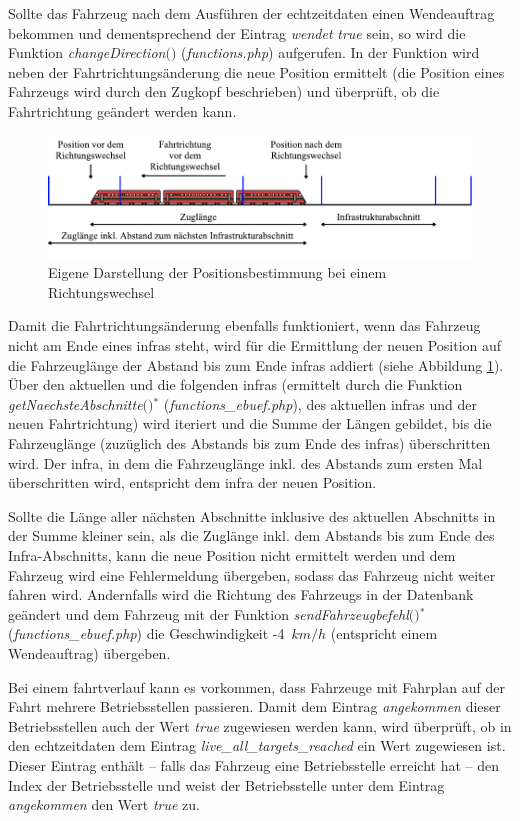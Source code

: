 Sollte das Fahrzeug nach dem Ausführen der \Gls{echtzeitdaten} einen Wendeauftrag bekommen und dementsprechend der Eintrag \textit{wendet} \textit{true} sein, so wird die Funktion \textit{change\-Direction$($$)$} (\textit{functions.php}) aufgerufen. In der Funktion wird neben der Fahrtrichtungsänderung die neue Position ermittelt (die Position eines Fahrzeugs wird durch den Zugkopf beschrieben) und überprüft, ob die Fahrtrichtung geändert werden kann. 
\begin{figure}
  \includegraphics[width=\linewidth]{../images/vector/richtungsaenderung.pdf}
  \caption{Eigene Darstellung der Positionsbestimmung bei einem Richtungswechsel}
  \label{fig:richtungsaenderung}
\end{figure}
Damit die Fahrtrichtungsänderung ebenfalls funktioniert, wenn das Fahrzeug nicht am Ende eines \ac{infra}s steht, wird für die Ermittlung der neuen Position auf die Fahrzeuglänge der Abstand bis zum Ende \ac{infra}s addiert (siehe Abbildung \ref{fig:richtungsaenderung}). Über den aktuellen und die folgenden \acp{infra} (ermittelt durch die Funktion \textit{getNaechsteAbschnitte$($$)$}$^\ast$ (\textit{functions\_ebuef.php}), des aktuellen \ac{infra}s und der neuen Fahrtrichtung) wird iteriert und die Summe der Längen gebildet, bis die Fahrzeuglänge (zuzüglich des Abstands bis zum Ende des \ac{infra}s) überschritten wird. Der \ac{infra}, in dem die Fahrzeuglänge inkl. des Abstands zum ersten Mal überschritten wird, entspricht dem \ac{infra} der neuen Position.

Sollte die Länge aller nächsten Abschnitte inklusive des aktuellen Abschnitts in der Summe kleiner sein, als die Zuglänge inkl. dem Abstands bis zum Ende des Infra-Abschnitts, kann die neue Position nicht ermittelt werden und dem Fahrzeug wird eine Fehlermeldung übergeben, sodass das Fahrzeug nicht weiter fahren wird. Andernfalls wird die Richtung des Fahrzeugs in der Datenbank geändert und dem Fahrzeug mit der Funktion \textit{send\-Fahrzeugbefehl$($$)$}$^\ast$ (\textit{functions\_ebuef.php}) die Geschwindigkeit \mbox{-4 $km/h$} (entspricht einem Wendeauftrag) übergeben.

Bei einem \Gls{fahrtverlauf} kann es vorkommen, dass Fahrzeuge mit Fahrplan auf der Fahrt mehrere Betriebsstellen passieren. Damit dem Eintrag \textit{angekommen} dieser Betriebsstellen auch der Wert \textit{true} zugewiesen werden kann, wird überprüft, ob in den \Gls{echtzeitdaten} dem Eintrag \textit{live\_all\_targets\_reached} ein Wert zugewiesen ist. Dieser Eintrag enthält -- falls das Fahrzeug eine Betriebsstelle erreicht hat -- den Index der Betriebsstelle und weist der Betriebsstelle unter dem Eintrag \textit{angekommen} den Wert \textit{true} zu.

